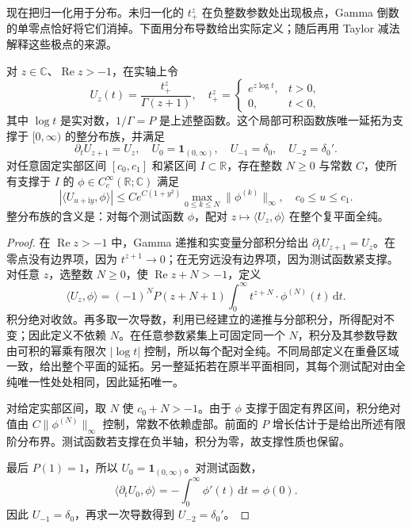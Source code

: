 \ProseParagraphBreak
现在把归一化用于分布。未归一化的 \(t_+^z\) 在负整数参数处出现极点，Gamma 倒数的单零点恰好将它们消掉。下面用分布导数给出实际定义；随后再用 Taylor 减法解释这些极点的来源。

\begin{lemma}[法向幂的解析分布族]\label{b2:lem:23-normal-analytic-family}
对 \(z\in\mathbb C\)、\(\operatorname{Re}z>-1\)，在实轴上令
\[
 U_z(t)=\frac{t_+^z}{\Gamma(z+1)},
 \quad
 t_+^z=
 \begin{cases}
  e^{z\log t},&t>0,\\
  0,&t<0,
 \end{cases}
\]
其中 \(\log t\) 是实对数，\(1/\Gamma=P\) 是上述整函数。这个局部可积函数族唯一延拓为支撑于 \([0,\infty)\) 的整分布族，并满足
\[
 \partial_tU_{z+1}=U_z,\quad
 U_0=\mathbf1_{(0,\infty)},\quad
 U_{-1}=\delta_0,\quad U_{-2}=\delta_0'.
\]
对任意固定实部区间 \([c_0,c_1]\) 和紧区间 \(I\subset\mathbb R\)，存在整数 \(N\geq0\) 与常数 \(C\)，使所有支撑于 \(I\) 的 \(\phi\in C_c^\infty(\mathbb R;\mathbb C)\) 满足
\[
 |\langle U_{u+\mathrm iy},\phi\rangle|
 \leq C e^{C(1+y^2)}
 \max_{0\leq k\leq N}\|\phi^{(k)}\|_\infty,
 \quad c_0\leq u\leq c_1.
\]
整分布族的含义是：对每个测试函数 \(\phi\)，配对 \(z\mapsto\langle U_z,\phi\rangle\) 在整个复平面全纯。
\end{lemma}
\begin{proof}
在 \(\operatorname{Re}z>-1\) 中，Gamma 递推和实变量分部积分给出
\(\partial_tU_{z+1}=U_z\)。在零点没有边界项，因为 \(t^{z+1}\to0\)；在无穷远没有边界项，因为测试函数紧支撑。对任意 \(z\)，选整数 \(N\geq0\)，使 \(\operatorname{Re}z+N>-1\)，定义
\[
 \langle U_z,\phi\rangle
 =(-1)^N P(z+N+1)
 \int_0^\infty t^{z+N}\cdot\phi^{(N)}(t)\,\mathrm dt.
\]
积分绝对收敛。再多取一次导数，利用已经建立的递推与分部积分，所得配对不变；因此定义不依赖 \(N\)。在任意参数紧集上可固定同一个 \(N\)，积分及其参数导数由可积的幂乘有限次 \(|\log t|\) 控制，所以每个配对全纯。不同局部定义在重叠区域一致，给出整个平面的延拓。另一整延拓若在原半平面相同，其每个测试配对由全纯唯一性处处相同，因此延拓唯一。

对给定实部区间，取 \(N\) 使 \(c_0+N>-1\)。由于 \(\phi\) 支撑于固定有界区间，积分绝对值由 \(C\|\phi^{(N)}\|_\infty\) 控制，常数不依赖虚部。前面的 \(P\) 增长估计于是给出所述有限阶分布界。测试函数若支撑在负半轴，积分为零，故支撑性质也保留。

最后 \(P(1)=1\)，所以 \(U_0=\mathbf1_{(0,\infty)}\)。对测试函数，
\[
 \langle\partial_tU_0,\phi\rangle
 =-\int_0^\infty\phi'(t)\,\mathrm dt=\phi(0).
\]
因此 \(U_{-1}=\delta_0\)，再求一次导数得到 \(U_{-2}=\delta_0'\)。
\end{proof}

